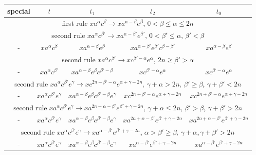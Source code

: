 \documentclass{article}
\theoremstyle{definition}
\begin{document}
\begin{center}
\begin{tabular}{|c|c|c|c|c|}
\hline
special & $t$ & $t_1$ & $t_2$ & $t_0$ \\
\hline
\hline
\multicolumn{5}{|c|}{first rule $x a^\alpha c^\beta \rightarrow x a^{\alpha - \beta} e^\beta$, $0< \beta \le \alpha  \le 2n$}\\
\hline
\hline
\multicolumn{5}{|c|}{second rule $x a^\alpha c^{\beta'} \rightarrow x a^{\alpha - \beta'} e^{\beta'}$, $0< \beta' \le \alpha$, $\beta' < \beta$}\\
\hline
- & $ x a^\alpha c^\beta  $ &  $  x  a^{\alpha - \beta} e^\beta   $ &   $   x a^{\alpha - \beta'} e^{\beta'}  c^{\beta-\beta'}    $ &  $ x a^{\alpha - \beta} e^\beta  $ \\
\hline
\multicolumn{5}{|c|}{second rule $x a^\alpha c^{\beta'} \rightarrow x c^{\beta' -\alpha} e^{\alpha}$, $2n \ge \beta' > \alpha$}\\
\hline
- & $ x a^\alpha c^{\beta'}  $ &  $  x  a^{\alpha - \beta} e^\beta c^{\beta'-\beta}  $ &   $   x c^{\beta'-\alpha} e^{\alpha} $ &  $ x c^{\beta'-\alpha} e^{\alpha}  $ \\
\hline
\multicolumn{5}{|c|}{second rule $x a^\alpha c^{\beta'} e^\gamma \rightarrow x c^{2n+\beta' -\alpha} e^{\alpha+\gamma-2n}$, $\gamma+\alpha > 2n$, $\beta' \ge \beta$, $\gamma+\beta'<2n$}\\
\hline
- & $ x a^\alpha c^{\beta'} e^\gamma  $ &  $  x  a^{\alpha - \beta} e^\beta c^{\beta'-\beta} e^\gamma $ &   $   x c^{2n+\beta' -\alpha} e^{\alpha+\gamma-2n} $ &  $ x c^{2n+\beta' -\alpha} e^{\alpha+\gamma-2n}  $ \\
\hline
\multicolumn{5}{|c|}{second rule $x a^\alpha c^{\beta'} e^\gamma \rightarrow x a^{2n+\alpha -\beta'} e^{\beta'+\gamma-2n}$, $\gamma+\alpha \le 2n$, $\beta' > \beta$, $\gamma+\beta'>2n$}\\
\hline
- & $ x a^\alpha c^{\beta'} e^\gamma  $ &  $  x  a^{\alpha - \beta} e^\beta c^{\beta'-\beta} e^\gamma $ & $   x a^{2n+\alpha -\beta'} e^{\beta'+\gamma-2n} $ &  $ x a^{2n+\alpha -\beta'} e^{\beta'+\gamma-2n}  $ \\
\hline
\multicolumn{5}{|c|}{second rule $x a^\alpha c^{\beta'} e^\gamma \rightarrow x a^{\alpha -\beta'} e^{\beta'+\gamma-2n}$,  $\alpha>\beta' \ge \beta$, $\gamma+\alpha, \gamma+\beta' > 2n$}\\
\hline
- & $ x a^\alpha c^{\beta'} e^\gamma  $ &  $  x  a^{\alpha - \beta} e^\beta c^{\beta'-\beta} e^\gamma $ & $   x a^{\alpha -\beta'} e^{\beta'+\gamma-2n} $ &  $ x a^{\alpha -\beta'} e^{\beta'+\gamma-2n}  $ \\

\end{tabular}
\end{center}
\end{document}
